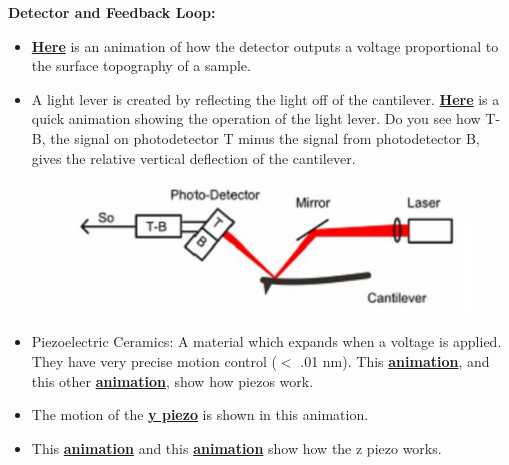 \documentclass{../lab}
\begin{document}
\noindent\textbf{Detector and Feedback Loop:}

\begin{itemize}
    \item \href{http://experimentationlab.berkeley.edu/sites/default/files/AFMImages/2.1.\%20photodetector.flv\_converted.mp4}{\textbf{Here}} is an animation of how the detector outputs a voltage proportional to the surface topography of a sample.

    \item A light lever is created by reflecting the light off of the cantilever.  \href{http://experimentationlab.berkeley.edu/sites/default/files/AFMImages/2.3.\%20Light\%20Lever.flv\_converted.mp4}{\textbf{Here}} is a quick animation showing the operation of the light lever. Do you see how T-B, the signal on photodetector T minus the signal from photodetector B, gives the relative vertical deflection of the cantilever.
    \begin{figure}[h]
        \centering
        \href{http://experimentationlab.berkeley.edu/sites/default/files/AFMImages/AFMlasermirror.png}{\includegraphics[width=0.5\linewidth]{images/AFMlasermirror.png}}
        \label{fig:AFMlasermirror}
    \end{figure}

    \item Piezoelectric Ceramics:  A material which expands when a voltage is applied.  They have very precise motion control ($<$ .01 nm).  This \href{http://experimentationlab.berkeley.edu/sites/default/files/AFMImages/3.1.\%20Motion.flv\_converted.mp4}{\textbf{animation}}, and this other \href{http://experimentationlab.berkeley.edu/sites/default/files/AFMImages/3.2.\%20proportional.flv\_converted.mp4}{\textbf{animation}}, show how piezos work.

    \item The motion of the \href{http://experimentationlab.berkeley.edu/sites/default/files/AFMImages/3.3.\%20Y\%20Scanner\_converted.mp4}{\textbf{y piezo}} is shown in this animation.

    \item This \href{http://experimentationlab.berkeley.edu/sites/default/files/AFMImages/3.4.\%20Z\%20Scanner.flv\_converted.mp4}{\textbf{animation}} and this\textbf{ }\href{http://experimentationlab.berkeley.edu/sites/default/files/AFMImages/4.1.\%20Z\%20motion.flv\_converted.mp4}{\textbf{animation}} show how the z piezo works.


\end{itemize}
\end{document}
